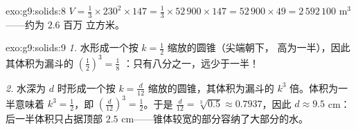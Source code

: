 \begin{solution}{exo:g9:solids:8}
$V = \frac13 \times 230^2 \times 147 = \frac13 \times 52\,900 \times 147
= 52\,900 \times 49 = 2\,592\,100$ m$^3$ ——约为 $2.6$ 百万
立方米。
\end{solution}

\begin{solution}{exo:g9:solids:9}
\emph{1.} 水形成一个按 $k = \frac12$ 缩放的圆锥（尖端朝下，
高为一半），因此其体积为漏斗的 $\left(\frac12\right)^3 = \frac18$
：只有八分之一，远少于一半！

\emph{2.} 水深为 $d$ 时形成一个按
$k = \frac{d}{12}$ 缩放的圆锥，其体积为漏斗的 $k^3$ 倍。体积为一半意味着
$k^3 = \frac12$，即
$\left(\frac{d}{12}\right)^3 = \frac12$。于是
$\frac{d}{12} = \sqrt[3]{0.5} \approx 0.7937$，因此
$d \approx 9.5$ cm：后一半体积只占据顶部
$2.5$ cm——锥体较宽的部分容纳了大部分的水。
\end{solution}


